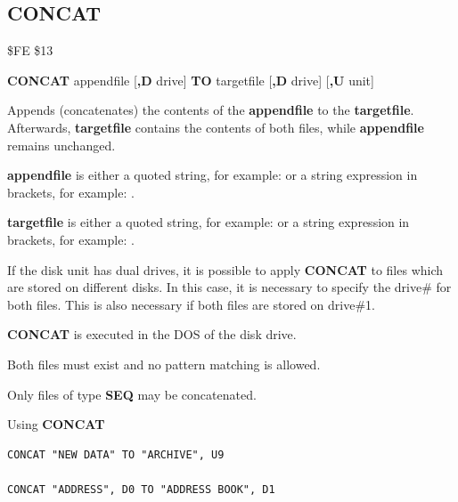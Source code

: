 
\newpage
\subsection{CONCAT}
\begin{description}[leftmargin=2cm,style=nextline]
\item [Token:]    \$FE \$13

\item [Format:]   {\bf CONCAT} appendfile [{\bf,D} drive] {\bf TO} targetfile [{\bf,D} drive] [{\bf,U} unit]

\item [Usage:]    Appends (concatenates) the contents of the {\bf appendfile} to the {\bf targetfile}. Afterwards, {\bf targetfile} contains the contents of both files, while {\bf appendfile} remains unchanged.

                  {\bf appendfile} is either a quoted string, for example:  or a string expression in brackets, for example: .

                  {\bf targetfile} is either a quoted string, for example:  or a string expression in brackets, for example: .

                  If the disk unit has dual drives, it is possible to apply {\bf CONCAT} to files which are stored on different disks. In this case, it is necessary to specify the drive\# for both files. This is also necessary if both files are stored on drive\#1.

                  \drivedefinition

                  \unitdefinition

\item [Remarks:]  {\bf CONCAT} is executed in the DOS of the disk drive. 

                  Both files must exist and no pattern matching is allowed.

                  Only files of type {\bf SEQ} may be concatenated.

\item [Examples:] Using {\bf CONCAT}

\begin{tcolorbox}[colback=black,coltext=white]
\verbatimfont{\codefont}
\begin{verbatim}
CONCAT "NEW DATA" TO "ARCHIVE", U9

CONCAT "ADDRESS", D0 TO "ADDRESS BOOK", D1
\end{verbatim}
\end{tcolorbox}
\end{description}

